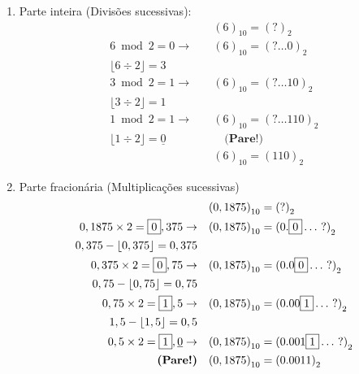 \documentclass{article}
\begin{document}
            \begin{enumerate}
                \item Parte inteira (Divisões sucessivas):
                    \begin{align*}
                        &{(6)}_{10} = {(?)}_2\\
                        6 \bmod 2 = \boxed{0} \rightarrow \quad &{(6)}_{10} = {(? \ldots \boxed{0})}_2\\
                        \lfloor  6 \div 2 \rfloor = 3 \quad &\\
                        3 \bmod 2 = \boxed{1} \rightarrow \quad &{(6)}_{10} = {(? \ldots \boxed{1}0)}_2\\
                        \lfloor  3 \div 2 \rfloor = 1 \quad &\\
                        1 \bmod 2 = \boxed{1} \rightarrow \quad &{(6)}_{10} = {(? \ldots \boxed{1}10)}_2\\
                        \lfloor  1 \div 2 \rfloor = \underline{0} \quad & \quad \textbf{(Pare!)} \\
                        &{(6)}_{10} = {(110)}_2
                    \end{align*}

                \item Parte fracionária (Multiplicações sucessivas)
                    \begin{align*}
                        &{(0,1875)}_{10} = {(?)}_2\\
                        0,1875 \times 2 = \boxed{0},375 \rightarrow \quad &{(0,1875)}_{10} = {(0.\boxed{0}\ldots~?)}_2\\
                        0,375 - \lfloor 0,375 \rfloor = 0,375 \quad &\\
                        0,375 \times 2 = \boxed{0},75 \rightarrow \quad &{(0,1875)}_{10} = {(0.0\boxed{0}\ldots~?)}_2\\
                        0,75 - \lfloor 0,75 \rfloor = 0,75 \quad &\\
                        0,75 \times 2 = \boxed{1},5 \rightarrow \quad &{(0,1875)}_{10} = {(0.00\boxed{1}\ldots~?)}_2\\
                        1,5 - \lfloor 1,5 \rfloor = 0,5 \quad &\\
                        0,5 \times 2 = \boxed{1},\underline{0} \rightarrow \quad &{(0,1875)}_{10} = {(0.001\boxed{1}\ldots~?)}_2\\
                        \textrm{\textbf{(Pare!)}} \quad &{(0,1875)}_{10} = {(0.0011)}_2
                    \end{align*}
                    

\end{enumerate}
\end{document}

